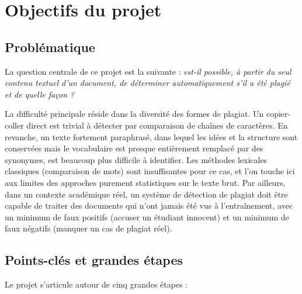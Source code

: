 \documentclass[12pt,a4paper]{article}
\begin{document}
\section{Objectifs du projet}

\subsection{Problématique}

La question centrale de ce projet est la suivante : \textit{est-il possible, à partir du seul contenu textuel d'un document, de déterminer automatiquement s'il a été plagié et de quelle façon ?}

La difficulté principale réside dans la diversité des formes de plagiat. Un copier-coller direct est trivial à détecter par comparaison de chaînes de caractères. En revanche, un texte fortement paraphrasé, dans lequel les idées et la structure sont conservées mais le vocabulaire est presque entièrement remplacé par des synonymes, est beaucoup plus difficile à identifier. Les méthodes lexicales classiques (comparaison de mots) sont insuffisantes pour ce cas, et l'on touche ici aux limites des approches purement statistiques sur le texte brut.
Par ailleurs, dans un contexte académique réel, un système de détection de plagiat doit être capable de traiter des documents qui n'ont jamais été vus à l'entraînement, avec un minimum de faux positifs (accuser un étudiant innocent) et un minimum de faux négatifs (manquer un cas de plagiat réel).

\subsection{Points-clés et grandes étapes}

Le projet s'articule autour de cinq grandes étapes :
\end{document}
